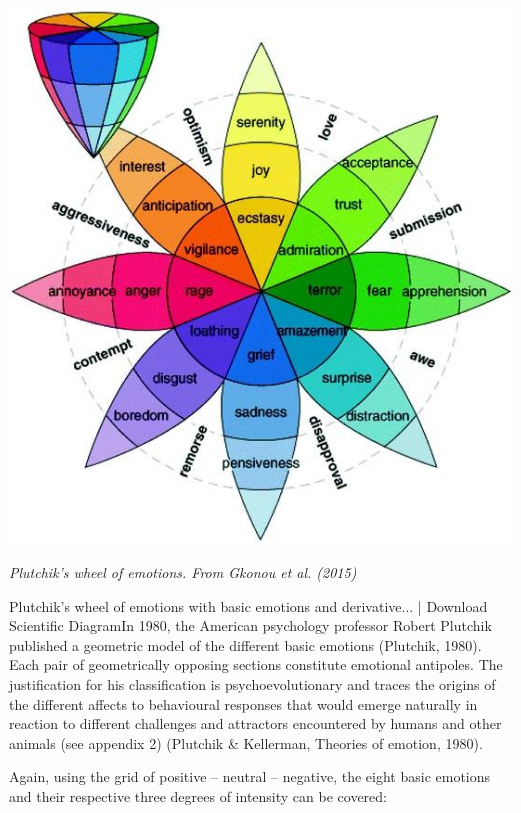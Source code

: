 
\begin{center}
	\includegraphics[scale=0.3]{./Images/emotions.jpg}

	{\it \footnotesize Plutchik's wheel of emotions. From Gkonou et al. (2015)}
\end{center}

\noindent Plutchik's wheel of emotions with basic emotions and derivative... |  Download Scientific DiagramIn 1980, the American psychology professor Robert Plutchik published a geometric model of the different basic emotions  (Plutchik, 1980). Each pair of geometrically opposing sections constitute emotional antipoles. The justification for his classification is psychoevolutionary and traces the origins of the different affects to behavioural responses that would emerge naturally in reaction to different challenges and attractors encountered by humans and other animals (see appendix 2) (Plutchik \& Kellerman, Theories of emotion, 1980).  

Again, using the grid of positive – neutral – negative, the eight basic emotions and their respective three degrees of intensity can be covered: 

